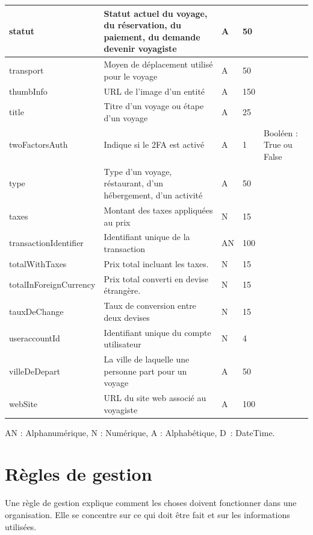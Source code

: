 \documentclass[12pt]{report}
\begin{document}
\begin{longtable}{|p{2cm}|p{4cm}|p{2cm}|p{2cm}|p{4cm}|}
						\hline
						statut & Statut actuel du voyage, du réservation, du paiement, du demande devenir voyagiste& A &50 &\\
						\hline
						transport & Moyen de déplacement utilisé pour le voyage & A & 50&\\
						\hline
						thumbInfo & URL de l'image d'un entité & A &150&\\
						\hline
						title & Titre d'un voyage ou étape d'un voyage & A & 25&\\
						\hline
						twoFactorsAuth & Indique si le 2FA est activé & A & 1 & Booléen : True ou False\\
						\hline
						type & Type d'un voyage, réstaurant, d'un hébergement, d'un activité& A&50&\\
						\hline
						taxes & Montant des taxes appliquées au prix & N & 15&\\
						\hline
						transactionIdentifier & Identifiant unique de la transaction & AN & 100&\\
						\hline
						totalWithTaxes & Prix total incluant les taxes. &N &15&\\
						\hline
						totalInForeignCurrency & Prix total converti en devise étrangère. & N & 15 &\\	
						\hline
						 tauxDeChange& Taux de conversion entre deux devises & N &15 & \\
						\hline
						useraccountId & Identifiant unique du compte utilisateur & N & 4 &\\
						\hline
						villeDeDepart & La ville de laquelle une personne part pour un voyage & A & 50 &\\
						\hline
						webSite & URL du site web associé au voyagiste & A & 100 &\\
						\hline
				\end{longtable}

				AN : Alphanumérique, N : Numérique, A : Alphabétique, D : DateTime.




			\section{Règles de gestion}

			\hspace{15pt} Une règle de gestion explique comment les choses doivent fonctionner dans une organisation. Elle se concentre sur ce qui doit être fait et sur les informations utilisées.
\end{document}
